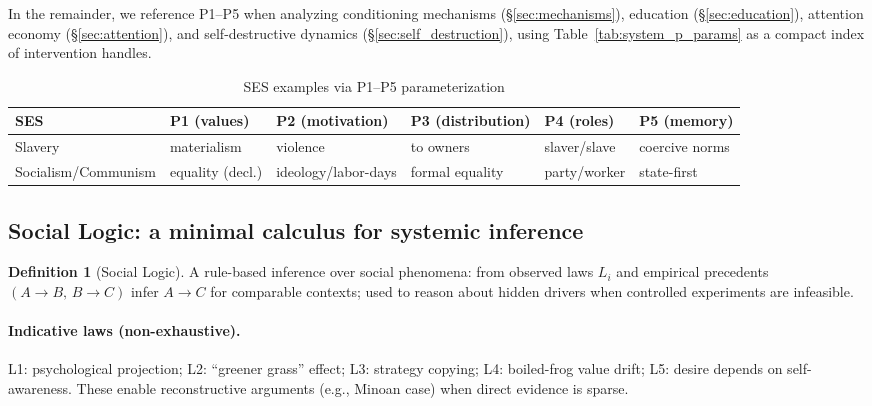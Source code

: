 \documentclass[11pt,a4paper]{article}
\theoremstyle{definition}
\newtheorem{definition}{Definition}[section]
\theoremstyle{remark}
\begin{document}
\noindent
In the remainder, we reference P1–P5 when analyzing conditioning mechanisms (\S\ref{sec:mechanisms}), education (\S\ref{sec:education}), attention economy (\S\ref{sec:attention}), and self-destructive dynamics (\S\ref{sec:self_destruction}), using Table~\ref{tab:system_p_params} as a compact index of intervention handles.

\begin{table}[h]
\centering
\caption{SES examples via P1--P5 parameterization}
\label{tab:ses_examples}
\renewcommand{\arraystretch}{1.1}
\begin{tabular}{@{}llllll@{}}
\toprule
\textbf{SES} & P1 (values) & P2 (motivation) & P3 (distribution) & P4 (roles) & P5 (memory) \\
\midrule
Slavery & materialism & violence & to owners & slaver/slave & coercive norms \\
Socialism/Communism & equality (decl.) & ideology/labor-days & formal equality & party/worker & state-first \\
\bottomrule
\end{tabular}
\end{table}



\subsection{Social Logic: a minimal calculus for systemic inference}
\label{subsec:social_logic}

\begin{definition}[Social Logic]
A rule-based inference over social phenomena: from observed laws $L_i$ and empirical precedents $(A\!\to\!B,\,B\!\to\!C)$ infer $A\!\to\!C$ for comparable contexts; used to reason about hidden drivers when controlled experiments are infeasible. %
\end{definition}

\paragraph{Indicative laws (non-exhaustive).}
L1: psychological projection; L2: “greener grass” effect; L3: strategy copying; L4: boiled-frog value drift; L5: desire depends on self-awareness. These enable reconstructive arguments (e.g., Minoan case) when direct evidence is sparse. %
\end{document}
